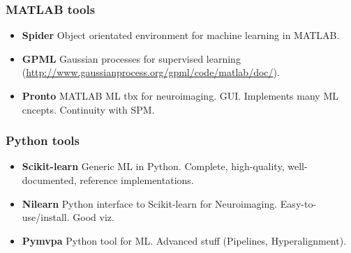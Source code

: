 \begin{frame}
\frametitle{MATLAB tools}
\begin{itemize}
\item \textbf{Spider} Object orientated environment for machine learning in MATLAB.
\item \textbf{GPML} Gaussian processes for supervised learning (\url{http://www.gaussianprocess.org/gpml/code/matlab/doc/}).
\item \textbf{Pronto} MATLAB ML tbx for neuroimaging. GUI. Implements many ML cncepts. Continuity with SPM.
\end{itemize}
\end{frame}

\begin{frame}
\frametitle{Python tools}
\begin{itemize}
\item \textbf{Scikit-learn} Generic ML in Python. Complete,
  high-quality, well-documented, reference implementations.
\item \textbf{Nilearn} Python interface to Scikit-learn for
  Neuroimaging. Easy-to-use/install. Good viz.
\item \textbf{Pymvpa} Python tool for ML. Advanced stuff
  (Pipelines, Hyperalignment).
\end{itemize}
\end{frame}

